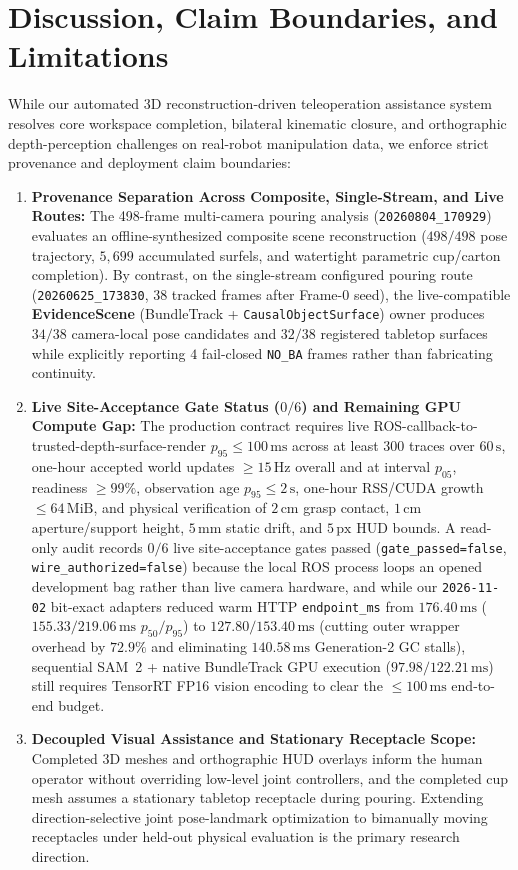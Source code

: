 \documentclass[10pt,journal]{IEEEtran}
\begin{document}
\section{Discussion, Claim Boundaries, and Limitations}
\label{sec:discussion}
While our automated 3D reconstruction-driven teleoperation assistance system resolves core workspace completion, bilateral kinematic closure, and orthographic depth-perception challenges on real-robot manipulation data, we enforce strict provenance and deployment claim boundaries:
\begin{enumerate}
    \item \textbf{Provenance Separation Across Composite, Single-Stream, and Live Routes:} The 498-frame multi-camera pouring analysis (\texttt{20260804\_170929}) evaluates an offline-synthesized composite scene reconstruction ($498/498$ pose trajectory, $5{,}699$ accumulated surfels, and watertight parametric cup/carton completion). By contrast, on the single-stream configured pouring route (\texttt{20260625\_173830}, $38$ tracked frames after Frame-0 seed), the live-compatible \textbf{EvidenceScene} (BundleTrack + \texttt{CausalObjectSurface}) owner produces $34/38$ camera-local pose candidates and $32/38$ registered tabletop surfaces while explicitly reporting $4$ fail-closed \texttt{NO\_BA} frames rather than fabricating continuity.
    \item \textbf{Live Site-Acceptance Gate Status ($0/6$) and Remaining GPU Compute Gap:} The production contract requires live ROS-callback-to-trusted-depth-surface-render $p_{95} \le 100\,\mathrm{ms}$ across at least $300$ traces over $60\,\mathrm{s}$, one-hour accepted world updates $\ge 15\,\mathrm{Hz}$ overall and at interval $p_{05}$, readiness $\ge 99\%$, observation age $p_{95} \le 2\,\mathrm{s}$, one-hour RSS/CUDA growth $\le 64\,\mathrm{MiB}$, and physical verification of $2\,\mathrm{cm}$ grasp contact, $1\,\mathrm{cm}$ aperture/support height, $5\,\mathrm{mm}$ static drift, and $5\,\mathrm{px}$ HUD bounds. A read-only audit records $0/6$ live site-acceptance gates passed (\texttt{gate\_passed=false}, \texttt{wire\_authorized=false}) because the local ROS process loops an opened development bag rather than live camera hardware, and while our \texttt{2026-11-02} bit-exact adapters reduced warm HTTP \texttt{endpoint\_ms} from $176.40\,\mathrm{ms}$ ($155.33/219.06\,\mathrm{ms}$ $p_{50}/p_{95}$) to $\mathbf{127.80 / 153.40\,\mathrm{ms}}$ (cutting outer wrapper overhead by $72.9\%$ and eliminating $140.58\,\mathrm{ms}$ Generation-2 GC stalls), sequential SAM~2 + native BundleTrack GPU execution ($97.98 / 122.21\,\mathrm{ms}$) still requires TensorRT FP16 vision encoding to clear the $\le 100\,\mathrm{ms}$ end-to-end budget.
    \item \textbf{Decoupled Visual Assistance and Stationary Receptacle Scope:} Completed 3D meshes and orthographic HUD overlays inform the human operator without overriding low-level joint controllers, and the completed cup mesh assumes a stationary tabletop receptacle during pouring. Extending direction-selective joint pose-landmark optimization to bimanually moving receptacles under held-out physical evaluation is the primary research direction.
\end{enumerate}
\end{document}
